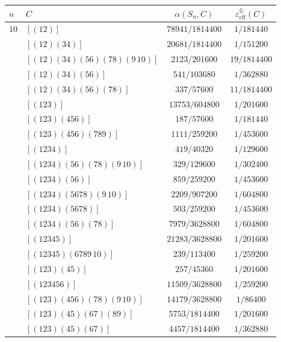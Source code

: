 \documentclass[12pt]{amsart}
\theoremstyle{definition} \newtheorem{definition}[theorem]{Definition}
\theoremstyle{example} \newtheorem{example}[theorem]{Example}
\theoremstyle{remark} \newtheorem{remark}{Remark}[theorem]
\numberwithin{equation}{section}
\numberwithin{theorem}{section}
\renewcommand{\epsilon}{\varepsilon}
\begin{document}
	{\tiny
	\begin{table}[h]
		\begin{minipage}[t]{0.5\textwidth}
		\begin{tabular}{|l|l|c|c|} \hline
			$n$ & $C$ & $\alpha(S_n,C)$ & $\epsilon_\mathrm{eff}^\mathbb{Q}(C)$ \\ \hline
			$10$& $[(1 2)]$ & $78941/1814400$ & $1/181440$ \\
				& $[(1 2)(3 4)]$ & $20681/1814400$ & $1/151200$ \\
				& $[(1 2)(3 4)(5 6)(7 8)(9 \,10)]$ & $2123/201600$ & $19/1814400$ \\
				& $[(1 2)(3 4)(5 6)]$ & $541/103680$ & $1/362880$ \\
				& $[(1 2)(3 4)(5 6)(7 8)]$ & $337/57600$ & $11/1814400$ \\
				& $[(1 2 3)]$ & $13753/604800$ & $1/201600$ \\
				& $[(1 2 3)(4 5 6)]$ & $187/57600$ & $1/181440$ \\
				& $[(1 2 3)(4 5 6)(7 8 9)]$ & $1111/259200$ & $1/453600$ \\
				& $[(1 2 3 4)]$ & $419/40320$ & $1/129600$ \\
				& $[(1 2 3 4)(5 6)(7 8)(9 \,10)]$ & $329/129600$ & $1/302400$ \\
				& $[(1 2 3 4)(5 6)]$ & $859/259200$ & $1/453600$ \\
				& $[(1 2 3 4)(5 6 7 8)(9 \,10)]$ & $2209/907200$ & $1/604800$ \\
				& $[(1 2 3 4)(5 6 7 8)]$ & $503/259200$ & $1/453600$ \\
				& $[(1 2 3 4)(5 6)(7 8)]$ & $7979/3628800$ & $1/604800$ \\
				& $[(1 2 3 4 5)]$ & $21283/3628800$ & $1/201600$ \\
				& $[(1 2 3 4 5)(6 7 8 9 \,10)]$ & $239/113400$ & $1/259200$ \\
				& $[(1 2 3)(4 5)]$ & $257/45360$ & $1/201600$ \\
				& $[(1 2 3 4 5 6)]$ & $11509/3628800$ & $1/259200$ \\
				& $[(1 2 3)(4 5 6)(7 8)(9 \,10)]$ & $14179/3628800$ & $1/86400$ \\
				& $[(1 2 3)(4 5)(6 7)(8 9)]$ & $5753/1814400$ & $1/201600$ \\
				& $[(1 2 3)(4 5)(6 7)]$ & $4457/1814400$ & $1/362880$ \\
			\hline
		\end{tabular}
		\end{minipage}
		\begin{minipage}[t]{0.49\textwidth}

\end{minipage}
\end{table}}
\end{document}
